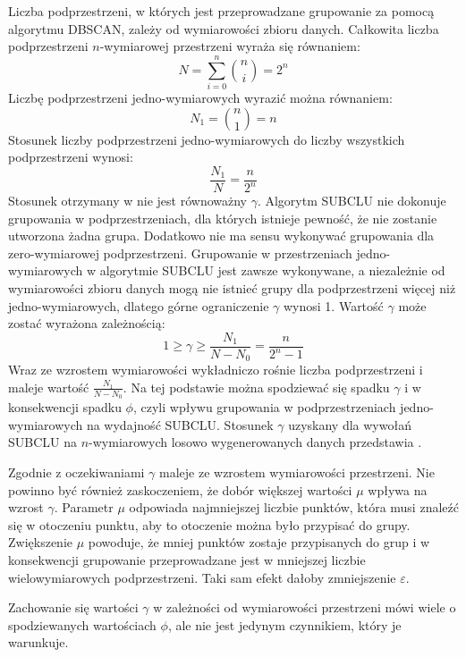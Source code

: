 Liczba podprzestrzeni, w których jest przeprowadzane grupowanie za pomocą algorytmu DBSCAN, zależy od wymiarowości zbioru danych. Całkowita liczba podprzestrzeni $ n $-wymiarowej przestrzeni wyraża się równaniem:
\begin{equation}
	N = \displaystyle\sum_{i=0}^{n} \binom{n}{i} = 2^n
\end{equation}
Liczbę podprzestrzeni jedno-wymiarowych wyrazić można równaniem:
\begin{equation}
	N_1 = \binom{n}{1} = n
\end{equation}
Stosunek liczby podprzestrzeni jedno-wymiarowych do liczby wszystkich podprzestrzeni wynosi:
\begin{equation}
	\label{eq:odc:subspaces-to-subspaces-1d-count-ratio}
	\frac{N_1}{N} = \frac{n}{2^n}
\end{equation}
Stosunek otrzymany w   nie jest równoważny $ \gamma $. Algorytm SUBCLU nie dokonuje grupowania w podprzestrzeniach, dla których istnieje pewność, że nie zostanie utworzona żadna grupa. Dodatkowo nie ma sensu wykonywać grupowania dla zero-wymiarowej podprzestrzeni. Grupowanie w przestrzeniach jedno-wymiarowych w algorytmie SUBCLU jest zawsze wykonywane, a niezależnie od wymiarowości zbioru danych mogą nie istnieć grupy dla podprzestrzeni więcej niż jedno-wymiarowych, dlatego górne ograniczenie $ \gamma $ wynosi 1. Wartość $ \gamma $ może zostać wyrażona zależnością:
\begin{equation}
	\label{eq:odc:subclu_1d_nd_subspaces_count_ratio}
	1 \ge \gamma \ge \frac{N_1}{N-N_0} = \frac{n}{2^n-1}
\end{equation}
Wraz ze wzrostem wymiarowości wykładniczo rośnie liczba podprzestrzeni i maleje wartość $ \frac{N_1}{N-N_0} $. Na tej podstawie można spodziewać się spadku $ \gamma $ i w konsekwencji spadku $ \phi $, czyli wpływu grupowania w podprzestrzeniach jedno-wymiarowych na wydajność SUBCLU. Stosunek $ \gamma $ uzyskany dla wywołań SUBCLU na $ n $-wymiarowych losowo wygenerowanych danych przedstawia .



Zgodnie z oczekiwaniami $ \gamma $ maleje ze wzrostem wymiarowości przestrzeni. Nie powinno być również zaskoczeniem, że dobór większej wartości $ \mu $ wpływa na wzrost $ \gamma $. Parametr $ \mu $ odpowiada najmniejszej liczbie punktów, która musi znaleźć się w otoczeniu punktu, aby to otoczenie można było przypisać do grupy. Zwiększenie $ \mu $ powoduje, że mniej punktów zostaje przypisanych do grup i w konsekwencji grupowanie przeprowadzane jest w mniejszej liczbie wielowymiarowych podprzestrzeni. Taki sam efekt dałoby zmniejszenie $ \varepsilon $.\par
Zachowanie się wartości $ \gamma $ w zależności od wymiarowości przestrzeni mówi wiele o spodziewanych wartościach $ \phi $, ale nie jest jedynym czynnikiem, który je warunkuje. 

